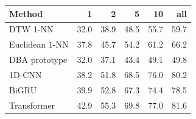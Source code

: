 \begin{tabular}{lrrrrr}
\toprule
Method & 1 & 2 & 5 & 10 & all \\
\midrule
DTW 1-NN & 32.0 & 38.9 & 48.5 & 55.7 & 59.7 \\
Euclidean 1-NN & 37.8 & 45.7 & 54.2 & 61.2 & 66.2 \\
DBA prototype & 32.0 & 37.1 & 43.4 & 49.1 & 49.8 \\
1D-CNN & 38.2 & 51.8 & 68.5 & 76.0 & 80.2 \\
BiGRU & 39.9 & 52.8 & 67.3 & 74.4 & 78.5 \\
Transformer & 42.9 & 55.3 & 69.8 & 77.0 & 81.6 \\
\bottomrule
\end{tabular}
